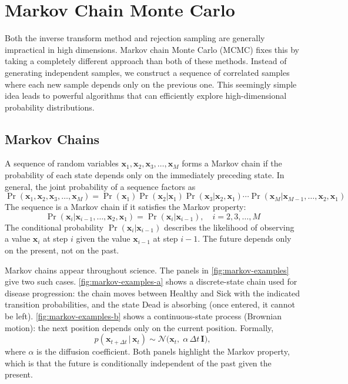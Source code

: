 \section{Markov Chain Monte Carlo}

Both the inverse transform method and rejection sampling are generally impractical in high dimensions. Markov chain Monte Carlo (MCMC) fixes this by taking a completely different approach than both of these methods. Instead of generating independent samples, we construct a sequence of correlated samples where each new sample depends only on the previous one. This seemingly simple idea leads to powerful algorithms that can efficiently explore high-dimensional probability distributions.

\subsection{Markov Chains}
A sequence of random variables $\mathbf{x}_1, \mathbf{x}_2, \mathbf{x}_3, \ldots, \mathbf{x}_M$ forms a Markov chain if the probability of each state depends only on the immediately preceding state. In general, the joint probability of a sequence factors as
\begin{equation}
    \Pr(\mathbf{x}_1, \mathbf{x}_2, \mathbf{x}_3, \ldots, \mathbf{x}_M) = \Pr(\mathbf{x}_1) \Pr(\mathbf{x}_2|\mathbf{x}_1) \Pr(\mathbf{x}_3|\mathbf{x}_2, \mathbf{x}_1) \cdots \Pr(\mathbf{x}_M|\mathbf{x}_{M-1}, \ldots, \mathbf{x}_2, \mathbf{x}_1)
\end{equation}
The sequence is a Markov chain if it satisfies the Markov property:
\begin{equation}
    \Pr(\mathbf{x}_i|\mathbf{x}_{i-1}, \ldots, \mathbf{x}_2, \mathbf{x}_1) = \Pr(\mathbf{x}_i|\mathbf{x}_{i-1}), \quad i = 2, 3, \ldots, M
\end{equation}
The conditional probability $\Pr(\mathbf{x}_i|\mathbf{x}_{i-1})$ describes the likelihood of observing a value $\mathbf{x}_i$ at step $i$ given the value $\mathbf{x}_{i-1}$ at step $i-1$. The future depends only on the present, not on the past.

Markov chains appear throughout science. The panels in \autoref{fig:markov-examples} give two such cases. \autoref{fig:markov-examples-a} shows a discrete-state chain used for disease progression: the chain moves between Healthy and Sick with the indicated transition probabilities, and the state Dead is absorbing (once entered, it cannot be left). \autoref{fig:markov-examples-b} shows a continuous-state process (Brownian motion): the next position depends only on the current position. Formally,
\begin{equation}
    p(\mathbf{x}_{t+\Delta t}\,|\,\mathbf{x}_t) \sim \mathcal{N}\!\big(\mathbf{x}_t,\; \alpha\, \Delta t\, \mathbf{I}\big),
\end{equation}
where $\alpha$ is the diffusion coefficient. Both panels highlight the Markov property, which is that the future is conditionally independent of the past given the present.

